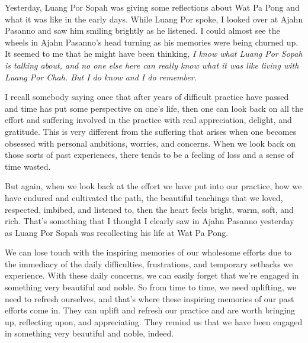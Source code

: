 
Yesterday, Luang Por Sopah was giving some reflections about Wat Pa 
Pong and what it was like in the early days. While Luang Por spoke, I 
looked over at Ajahn Pasanno and saw him smiling brightly as he 
listened. I could almost see the wheels in Ajahn Pasanno's head turning 
as his memories were being churned up. It seemed to me that he might 
have been thinking, \emph{I know what Luang Por Sopah is talking about, 
and no one else here can really know what it was like living with Luang 
Por Chah. But I do know and I do remember.}

I recall somebody saying once that after years of difficult practice 
have passed and time has put some perspective on one's life, then one 
can look back on all the effort and suffering involved in the practice 
with real appreciation, delight, and gratitude. This is very different 
from the suffering that arises when one becomes obsessed with personal 
ambitions, worries, and concerns. When we look back on those sorts of 
past experiences, there tends to be a feeling of loss and a sense of 
time wasted.

But again, when we look back at the effort we have put into our 
practice, how we have endured and cultivated the path, the beautiful 
teachings that we loved, respected, imbibed, and listened to, then the 
heart feels bright, warm, soft, and rich. That's something that I 
thought I clearly saw in Ajahn Pasanno yesterday as Luang Por Sopah was 
recollecting his life at Wat Pa Pong.

We can lose touch with the inspiring memories of our wholesome efforts 
due to the immediacy of the daily difficulties, frustrations, and 
temporary setbacks we experience. With these daily concerns, we can 
easily forget that we're engaged in something very beautiful and noble. 
So from time to time, we need uplifting, we need to refresh ourselves, 
and that's where these inspiring memories of our past efforts come in. 
They can uplift and refresh our practice and are worth bringing up, 
reflecting upon, and appreciating. They remind us that we have been 
engaged in something very beautiful and noble, indeed.


